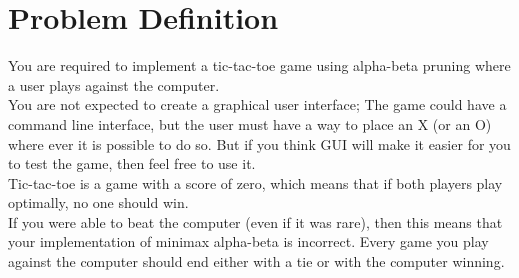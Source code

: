 \chapter{Problem Definition}

You are required to implement a tic-tac-toe game using alpha-beta pruning where a user plays against the computer. \\

You are not expected to create a graphical user interface; The game could have a command line interface, but the user must have a way to place an X (or an O) where ever it is possible to do so. But if you think GUI will make it easier for you to test the game, then feel free to use it. \\

Tic-tac-toe is a game with a score of zero, which means that if both players play optimally, no one should win.\\

If you were able to beat the computer (even if it was rare), then this means that your implementation of minimax alpha-beta is incorrect. Every game you play against the computer should end either with a tie or with the computer winning.
